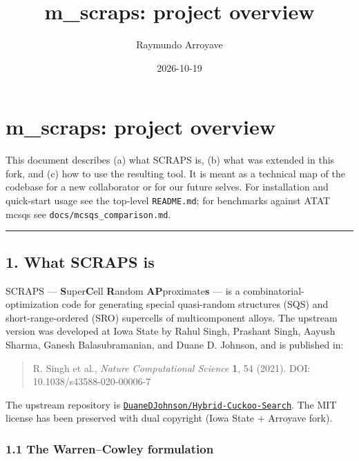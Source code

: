\documentclass[
  11pt,
]{article}
\title{m\_scraps: project overview}
\author{Raymundo Arroyave}
\date{2026-10-19}
\begin{document}
\maketitle

{
\setcounter{tocdepth}{2}
\tableofcontents
}
\section{m\_scraps: project overview}\label{m_scraps-project-overview}

This document describes (a) what SCRAPS is, (b) what was extended in
this fork, and (c) how to use the resulting tool. It is meant as a
technical map of the codebase for a new collaborator or for our future
selves. For installation and quick-start usage see the top-level
\texttt{README.md}; for benchmarks against ATAT mcsqs see
\texttt{docs/mcsqs\_comparison.md}.

\begin{center}\rule{0.5\linewidth}{0.5pt}\end{center}

\subsection{1. What SCRAPS is}\label{what-scraps-is}

SCRAPS --- \textbf{S}uper\textbf{C}ell \textbf{R}andom
\textbf{AP}proximate\textbf{s} --- is a combinatorial-optimization code
for generating special quasi-random structures (SQS) and
short-range-ordered (SRO) supercells of multicomponent alloys. The
upstream version was developed at Iowa State by Rahul Singh, Prashant
Singh, Aayush Sharma, Ganesh Balasubramanian, and Duane D. Johnson, and
is published in:

\begin{quote}
R. Singh et al., \emph{Nature Computational Science} \textbf{1}, 54
(2021). DOI: 10.1038/s43588-020-00006-7
\end{quote}

The upstream repository is
\href{https://github.com/DuaneDJohnson/Hybrid-Cuckoo-Search}{\texttt{DuaneDJohnson/Hybrid-Cuckoo-Search}}.
The MIT license has been preserved with dual copyright (Iowa State +
Arroyave fork).

\subsubsection{1.1 The Warren--Cowley
formulation}\label{the-warrencowley-formulation}
\end{document}
